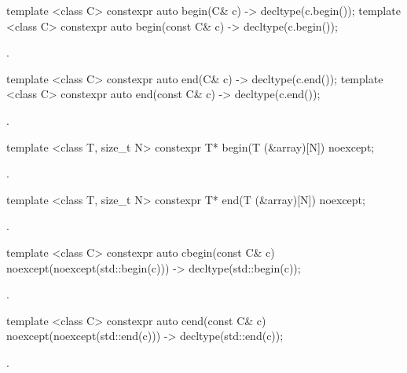 %
\begin{itemdecl}
template <class C> constexpr auto begin(C& c) -> decltype(c.begin());
template <class C> constexpr auto begin(const C& c) -> decltype(c.begin());
\end{itemdecl}

\begin{itemdescr}
\pnum
\returns {}.
\end{itemdescr}

%
\begin{itemdecl}
template <class C> constexpr auto end(C& c) -> decltype(c.end());
template <class C> constexpr auto end(const C& c) -> decltype(c.end());
\end{itemdecl}

\begin{itemdescr}
\pnum
\returns {}.
\end{itemdescr}

%
\begin{itemdecl}
template <class T, size_t N> constexpr T* begin(T (&array)[N]) noexcept;
\end{itemdecl}

\begin{itemdescr}
\pnum
\returns {}.
\end{itemdescr}

%
\begin{itemdecl}
template <class T, size_t N> constexpr T* end(T (&array)[N]) noexcept;
\end{itemdecl}

\begin{itemdescr}
\pnum
\returns {}.
\end{itemdescr}

%
\begin{itemdecl}
template <class C> constexpr auto cbegin(const C& c) noexcept(noexcept(std::begin(c)))
  -> decltype(std::begin(c));
\end{itemdecl}
\begin{itemdescr}
\pnum \returns {}.
\end{itemdescr}

%
\begin{itemdecl}
template <class C> constexpr auto cend(const C& c) noexcept(noexcept(std::end(c)))
  -> decltype(std::end(c));
\end{itemdecl}
\begin{itemdescr}
\pnum \returns {}.
\end{itemdescr}

